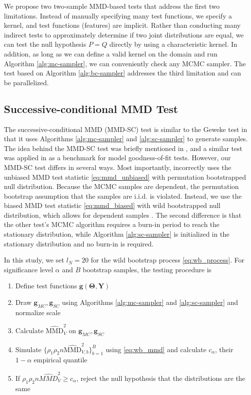 \documentclass[a4paper,12pt]{article}
\begin{document}
We propose two two-sample MMD-based tests that address the first two limitations. Instead of manually specifying many test functions, we specify a kernel, and test functions (features) are implicit. Rather than conducting many indirect tests to approximately determine if two joint distributions are equal, we can test the null hypothesis $P=Q$ directly by using a characteristic kernel. In addition, as long as we can define a valid kernel on the domain and run Algorithm \ref{alg:mc-sampler}, we can conveniently check any MCMC sampler. The test based on Algorithm \ref{alg:bc-sampler} addresses the third limitation and can be parallelized.

\subsection{Successive-conditional MMD Test}
The successive-conditional MMD (MMD-SC) test is similar to the Geweke test in that it uses Algorithms \ref{alg:mc-sampler} and \ref{alg:sc-sampler} to generate samples. The idea behind the MMD-SC test was briefly mentioned in \cite{lloyd_statistical_2015}, and a similar test was applied in \cite{liu_kernelized_2016} as a benchmark for model goodness-of-fit tests. However, our MMD-SC test differs in several ways. Most importantly, \cite{liu_kernelized_2016} incorrectly uses the unbiased MMD test statistic \eqref{eq:mmd_unbiased} with permutation bootstrapped null distribution. Because the MCMC samples are dependent, the permutation bootstrap assumption that the samples are i.i.d. is violated. Instead, we use the biased MMD test statistic \eqref{eq:mmd_biased} with wild bootstrapped null distribution, which allows for dependent samples \cite{chwialkowski_wild_2016}. The second difference is that the other test's MCMC algorithm requires a burn-in period to reach the stationary distribution, while Algorithm \ref{alg:sc-sampler} is initialized in the stationary distribution and no burn-in is required.

In this study, we set $l_N=20$ for the wild bootstrap process \eqref{eq:wb_process}. For significance level $\alpha$ and $B$ bootstrap samples, the testing procedure is
\begin{enumerate}
    \item Define test functions $\mathbf{g}(\mathbf{\Theta}, \mathbf{Y})$
    \item Draw $\mathbf{g}_{MC}, \mathbf{g}_{SC}$ using Algorithms \ref{alg:mc-sampler} and \ref{alg:sc-sampler} and normalize scale
    \item Calculate $\widehat{\mathrm{MMD}}_{V}^{2}$ on $\mathbf{g}_{MC}, \mathbf{g}_{SC}$
    \item Simulate $\{\rho_{1} \rho_{2} n \widehat{\mathrm{MMD}}^{2}_{V, b}\}_{b=1}^{B}$ using \eqref{eq:wb_mmd} and calculate $c_{\alpha}$, their $1-\alpha$ empirical quantile
    \item If $\rho_{1} \rho_{2} n \widehat{MMD}^{2}_{V} \geq c_{\alpha}$, reject the null hypothesis that the distributions are the same
\end{enumerate}
\end{document}
